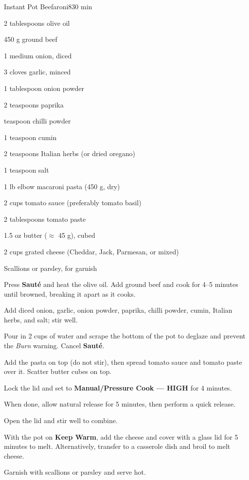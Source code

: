 \begin{recipebox}{Instant Pot Beefaroni}{8}{30 min}
  \begin{ingredients}
    \item 2 tablespoons olive oil
    \item 450 g ground beef
    \item 1 medium onion, diced
    \item 3 cloves garlic, minced
    \item 1 tablespoon onion powder
    \item 2 teaspoons paprika
    \item {} teaspoon chilli powder
    \item 1 teaspoon cumin
    \item 2 teaspoons Italian herbs (or dried oregano)
    \item 1 teaspoon salt
    \item 1 lb elbow macaroni pasta (450 g, dry)
    \item 2 cups tomato sauce (preferably tomato basil)
    \item 2 tablespoons tomato paste
    \item 1.5 oz butter (\(\approx\) 45 g), cubed
    \item 2 cups grated cheese (Cheddar, Jack, Parmesan, or mixed)
    \item Scallions or parsley, for garnish
  \end{ingredients}

  \begin{method}
    \item Press \textbf{Sauté} and heat the olive oil. Add ground beef and cook for 4–5 minutes until browned, breaking it apart as it cooks.
    \item Add diced onion, garlic, onion powder, paprika, chilli powder, cumin, Italian herbs, and salt; stir well.
    \item Pour in 2 cups of water and scrape the bottom of the pot to deglaze and prevent the \emph{Burn} warning. Cancel \textbf{Sauté}.
    \item Add the pasta on top (do not stir), then spread tomato sauce and tomato paste over it. Scatter butter cubes on top.
    \item Lock the lid and set to \textbf{Manual/Pressure Cook — HIGH} for 4 minutes.
    \item When done, allow natural release for 5 minutes, then perform a quick release.
    \item Open the lid and stir well to combine.
    \item With the pot on \textbf{Keep Warm}, add the cheese and cover with a glass lid for 5 minutes to melt. Alternatively, transfer to a casserole dish and broil to melt cheese.
    \item Garnish with scallions or parsley and serve hot.
  \end{method}


\end{recipebox}
